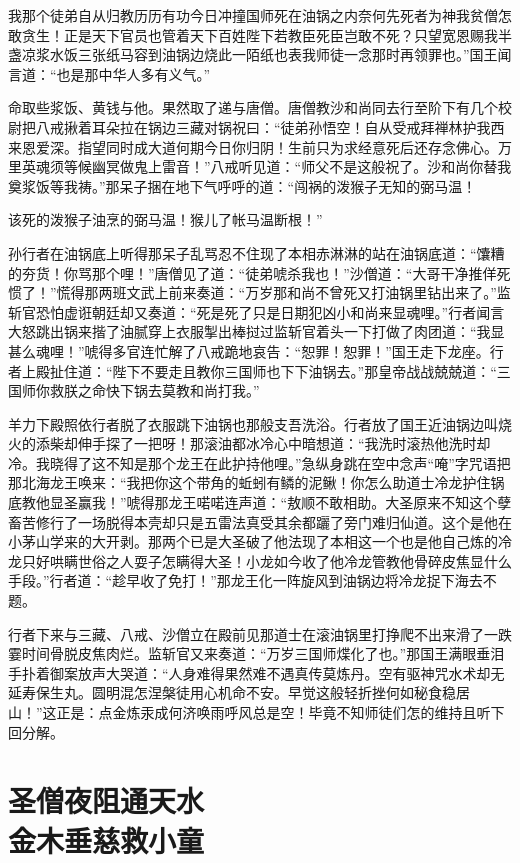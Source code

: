 \documentclass[12pt,UTF8]{ctexbook}
\begin{document}
{我那个徒弟自从归教历历有功今日冲撞国师死在油锅之内奈何先死者为神我贫僧怎敢贪生！正是天下官员也管着天下百姓陛下若教臣死臣岂敢不死？只望宽恩赐我半盏凉浆水饭三张纸马容到油锅边烧此一陌纸也表我师徒一念那时再领罪也。”国王闻言道：“也是那中华人多有义气。”

命取些浆饭、黄钱与他。果然取了递与唐僧。唐僧教沙和尚同去行至阶下有几个校尉把八戒揪着耳朵拉在锅边三藏对锅祝曰：“徒弟孙悟空！自从受戒拜禅林护我西来恩爱深。指望同时成大道何期今日你归阴！生前只为求经意死后还存念佛心。万里英魂须等候幽冥做鬼上雷音！”八戒听见道：“师父不是这般祝了。沙和尚你替我奠浆饭等我祷。”那呆子捆在地下气呼呼的道：“闯祸的泼猴子无知的弼马温！

该死的泼猴子油烹的弼马温！猴儿了帐马温断根！”

孙行者在油锅底上听得那呆子乱骂忍不住现了本相赤淋淋的站在油锅底道：“馕糟的夯货！你骂那个哩！”唐僧见了道：“徒弟唬杀我也！”沙僧道：“大哥干净推佯死惯了！”慌得那两班文武上前来奏道：“万岁那和尚不曾死又打油锅里钻出来了。”监斩官恐怕虚诳朝廷却又奏道：“死是死了只是日期犯凶小和尚来显魂哩。”行者闻言大怒跳出锅来揩了油腻穿上衣服掣出棒挝过监斩官着头一下打做了肉团道：“我显甚么魂哩！”唬得多官连忙解了八戒跪地哀告：“恕罪！恕罪！”国王走下龙座。行者上殿扯住道：“陛下不要走且教你三国师也下下油锅去。”那皇帝战战兢兢道：“三国师你救朕之命快下锅去莫教和尚打我。”

羊力下殿照依行者脱了衣服跳下油锅也那般支吾洗浴。行者放了国王近油锅边叫烧火的添柴却伸手探了一把呀！那滚油都冰冷心中暗想道：“我洗时滚热他洗时却冷。我晓得了这不知是那个龙王在此护持他哩。”急纵身跳在空中念声“唵”字咒语把那北海龙王唤来：“我把你这个带角的蚯蚓有鳞的泥鳅！你怎么助道士冷龙护住锅底教他显圣赢我！”唬得那龙王喏喏连声道：“敖顺不敢相助。大圣原来不知这个孽畜苦修行了一场脱得本壳却只是五雷法真受其余都躧了旁门难归仙道。这个是他在小茅山学来的大开剥。那两个已是大圣破了他法现了本相这一个也是他自己炼的冷龙只好哄瞒世俗之人耍子怎瞒得大圣！小龙如今收了他冷龙管教他骨碎皮焦显什么手段。”行者道：“趁早收了免打！”那龙王化一阵旋风到油锅边将冷龙捉下海去不题。

行者下来与三藏、八戒、沙僧立在殿前见那道士在滚油锅里打挣爬不出来滑了一跌霎时间骨脱皮焦肉烂。监斩官又来奏道：“万岁三国师煠化了也。”那国王满眼垂泪手扑着御案放声大哭道：“人身难得果然难不遇真传莫炼丹。空有驱神咒水术却无延寿保生丸。圆明混怎涅槃徒用心机命不安。早觉这般轻折挫何如秘食稳居山！”这正是：点金炼汞成何济唤雨呼风总是空！毕竟不知师徒们怎的维持且听下回分解。

\chapter[圣僧夜阻通天水\ 金木垂慈救小童]{圣僧夜阻通天水\\金木垂慈救小童}
}
\end{document}
